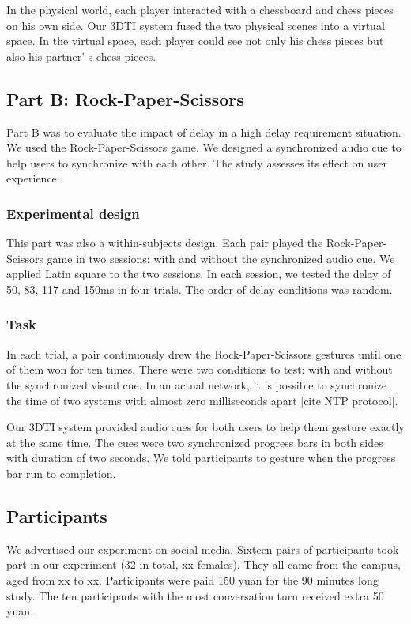 In the physical world, each player interacted with a chessboard and chess pieces on his own side. Our 3DTI system fused the two physical scenes into a virtual space. In the virtual space, each player could see not only his chess pieces but also his partner' s chess pieces.

\subsection{Part B: Rock-Paper-Scissors}

Part B was to evaluate the impact of delay in a high delay requirement situation. We used the Rock-Paper-Scissors game. We designed a synchronized audio cue to help users to synchronize with each other. The study assesses its effect on user experience.

\subsubsection{Experimental design}

This part was also a within-subjects design. Each pair played the Rock-Paper-Scissors game in two sessions: with and without the synchronized audio cue. We applied Latin square to the two sessions. In each session, we tested the delay of 50, 83, 117 and 150ms in four trials. The order of delay conditions was random.

\subsubsection{Task}

In each trial, a pair continuously drew the Rock-Paper-Scissors gestures until one of them won for ten times. There were two conditions to test: with and without the synchronized visual cue. In an actual network, it is possible to synchronize the time of two systems with almost zero milliseconds apart [cite NTP protocol].

Our 3DTI system provided audio cues for both users to help them gesture exactly at the same time. The cues were two synchronized progress bars in both sides with duration of two seconds. We told participants to gesture when the progress bar run to completion.

\subsection{Participants}

We advertised our experiment on social media. Sixteen pairs of participants took part in our experiment (32 in total, xx females). They all came from the campus, aged from xx to xx. Participants were paid 150 yuan for the 90 minutes long study. The ten participants with the most conversation turn received extra 50 yuan.

